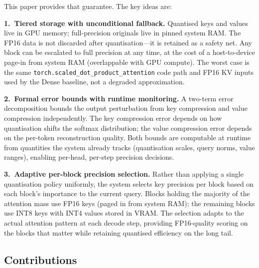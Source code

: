 \documentclass[11pt,a4paper]{article}
\theoremstyle{definition}
\theoremstyle{remark}
\newcommand{\torchsdpa}{\texttt{torch.scaled\_dot\_\hspace{0pt}product\_attention}}
\begin{document}
This paper provides that guarantee.  The key ideas are:

\textbf{1.\ Tiered storage with unconditional fallback.}  Quantised keys and values live in GPU memory; full-precision originals live in pinned system RAM\@.  The FP16 data is not discarded after quantisation---it is retained as a safety net.  Any block can be escalated to full precision at any time, at the cost of a host-to-device page-in from system RAM (overlappable with GPU compute).  The worst case is the same \torchsdpa{} code path and FP16 KV inputs used by the Dense baseline, not a degraded approximation.

\textbf{2.\ Formal error bounds with runtime monitoring.}  A two-term error decomposition bounds the output perturbation from key compression and value compression independently.  The key compression error depends on how quantisation shifts the softmax distribution; the value compression error depends on the per-token reconstruction quality.  Both bounds are computable at runtime from quantities the system already tracks (quantisation scales, query norms, value ranges), enabling per-head, per-step precision decisions.

\textbf{3.\ Adaptive per-block precision selection.}  Rather than applying a single quantisation policy uniformly, the system selects key precision per block based on each block's importance to the current query.  Blocks holding the majority of the attention mass use FP16 keys (paged in from system RAM); the remaining blocks use INT8 keys with INT4 values stored in VRAM.  The selection adapts to the actual attention pattern at each decode step, providing FP16-quality scoring on the blocks that matter while retaining quantised efficiency on the long tail.

\subsection{Contributions}
\end{document}
